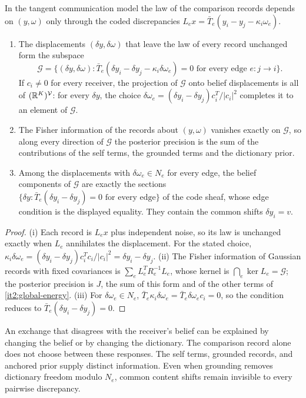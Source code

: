 \documentclass[11pt,letterpaper]{report}
\begin{document}
In the tangent communication model the law of the comparison records depends on $(y,\omega)$ only through the coded discrepancies $L_ex=\bar T_e(y_i-y_j-\kappa_i\omega_e)$.
\begin{enumerate}
\item[(i)] The displacements $(\delta y,\delta\omega)$ that leave the law of every record unchanged form the subspace
\begin{equation}
\mathcal G=\bigl\{(\delta y,\delta\omega):\bar T_e(\delta y_i-\delta y_j-\kappa_i\delta\omega_e)=0\text{ for every edge }e:j\to i\bigr\}.
\label{it2:gauge-space}
\end{equation}
If $c_i\neq0$ for every receiver, the projection of $\mathcal G$ onto belief displacements is all of $(\mathbb R^K)^{\mathcal V}$: for every $\delta y$, the choice $\delta\omega_e=(\delta y_i-\delta y_j)c_i^T/\vert c_i\vert^2$ completes it to an element of $\mathcal G$.
\item[(ii)] The Fisher information of the records about $(y,\omega)$ vanishes exactly on $\mathcal G$, so along every direction of $\mathcal G$ the posterior precision is the sum of the contributions of the self terms, the grounded terms and the dictionary prior.
\item[(iii)] Among the displacements with $\delta\omega_e\in N_e$ for every edge, the belief components of $\mathcal G$ are exactly the sections $\{\delta y:\bar T_e(\delta y_i-\delta y_j)=0\text{ for every edge}\}$ of the code sheaf, whose edge condition is the displayed equality. They contain the common shifts $\delta y_i=v$.
\end{enumerate}
\begin{proof}
(i) Each record is $L_ex$ plus independent noise, so its law is unchanged exactly when $L_e$ annihilates the displacement. For the stated choice, $\kappa_i\delta\omega_e=(\delta y_i-\delta y_j)c_i^Tc_i/\vert c_i\vert^2=\delta y_i-\delta y_j$. (ii) The Fisher information of Gaussian records with fixed covariances is $\sum_eL_e^TR_e^{-1}L_e$, whose kernel is $\bigcap_e\ker L_e=\mathcal G$; the posterior precision is $J$, the sum of this form and of the other terms of \cref{it2:global-energy}. (iii) For $\delta\omega_e\in N_e$, $\bar T_e\kappa_i\delta\omega_e=\bar T_e\delta\omega_ec_i=0$, so the condition reduces to $\bar T_e(\delta y_i-\delta y_j)=0$.
\end{proof}

An exchange that disagrees with the receiver's belief can be explained by changing the belief or by changing the dictionary. The comparison record alone does not choose between these responses. The self terms, grounded records, and anchored prior supply distinct information. Even when grounding removes dictionary freedom modulo $N_e$, common content shifts remain invisible to every pairwise discrepancy.
\end{document}
